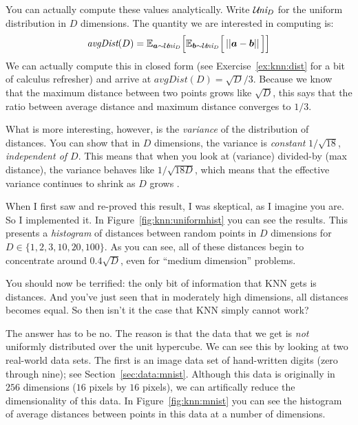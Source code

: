 You can actually compute these values analytically.  Write $\mathcal{U}\hspace{-0.5mm}\textit{ni}_D$ for
the uniform distribution in $D$ dimensions.  The quantity we are
interested in computing is:
\begin{equation} \label{eq:knn:dist}
  \textit{avgDist}(D)
  = \mathbb{E}_{\boldsymbol{a} \sim \mathcal{U}\hspace{-0.5mm}\textit{ni}_D} \Big[
    \mathbb{E}_{\boldsymbol{b} \sim \mathcal{U}\hspace{-0.5mm}\textit{ni}_D} \Big[
      \left\vert\left\vert \boldsymbol{a} - \boldsymbol{b} \right\vert\right\vert
      \Big] \Big]
\end{equation}
We can actually compute this in closed form (see
Exercise~\ref{ex:knn:dist} for a bit of calculus refresher) and arrive
at $\textit{avgDist}(D) = \sqrt D / 3$. Because we know that the maximum distance between two points grows like $\sqrt D$, this says that the ratio between average distance and maximum distance converges to $1/3$. 

What is more interesting, however, is the \emph{variance} of the distribution of distances. You can show that in $D$ dimensions, the variance is \emph{constant} $1/\sqrt{18}$, \emph{independent of $D$}. This means that when you look at (variance) divided-by (max distance), the variance behaves like $1/\sqrt{18 D}$, which means that the effective variance continues to shrink as $D$ grows \cite{brin95nn}.


When I first saw and re-proved this result, I was skeptical, as I
imagine you are.  So I implemented it.  In
Figure~\ref{fig:knn:uniformhist} you can see the results.  This
presents a \emph{histogram} of distances between random points in $D$
dimensions for $D \in \{1,2,3,10,20,100\}$.  As you can see, all of
these distances begin to concentrate around $0.4\sqrt{D}$, even for ``medium
dimension'' problems.

You should now be terrified: the only bit of information that KNN gets
is distances.  And you've just seen that in moderately high dimensions,
all distances becomes equal.  So then isn't it the case that KNN
simply cannot work?


The answer has to be no.  The reason is that the data that we get is
\emph{not} uniformly distributed over the unit hypercube.  We can see
this by looking at two real-world data sets.  The first is an image
data set of hand-written digits (zero through nine); see
Section~\ref{sec:data:mnist}.  Although this data is originally in
$256$ dimensions ($16$ pixels by $16$ pixels), we can artifically
reduce the dimensionality of this data.  In Figure~\ref{fig:knn:mnist}
you can see the histogram of average distances between points in this
data at a number of dimensions.

